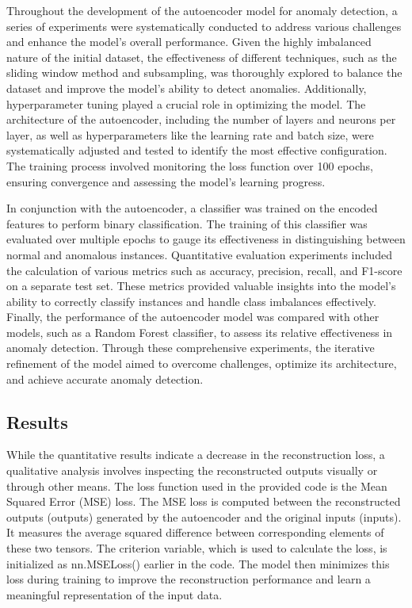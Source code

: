 \documentclass[10pt,twocolumn,letterpaper]{article}
\begin{document}
Throughout the development of the autoencoder model for anomaly detection, a series of experiments were systematically conducted to address various challenges and 
enhance the model's overall performance. Given the highly imbalanced nature of the initial dataset, the effectiveness of different techniques, such as the sliding window 
method and subsampling, was thoroughly explored to balance the dataset and improve the model's ability to detect anomalies. Additionally, hyperparameter tuning played a 
crucial role in optimizing the model. The architecture of the autoencoder, including the number of layers and neurons per layer, as well as hyperparameters like the learning 
rate and batch size, were systematically adjusted and tested to identify the most effective configuration. The training process involved monitoring the loss function over 100 
epochs, ensuring convergence and assessing the model's learning progress.

In conjunction with the autoencoder, a classifier was trained on the encoded features to perform binary classification. The training of this classifier was evaluated over 
multiple epochs to gauge its effectiveness in distinguishing between normal and anomalous instances. Quantitative evaluation experiments included the calculation of various 
metrics such as accuracy, precision, recall, and F1-score on a separate test set. These metrics provided valuable insights into the model's ability to correctly classify 
instances and handle class imbalances effectively. Finally, the performance of the autoencoder model was compared with other models, such as a Random Forest classifier, to 
assess its relative effectiveness in anomaly detection. Through these comprehensive experiments, the iterative refinement of the model aimed to overcome challenges, optimize 
its architecture, and achieve accurate anomaly detection.

\subsection{Results}
While the quantitative results indicate a decrease in the reconstruction loss, a qualitative analysis involves inspecting the reconstructed outputs visually or through 
other means. The loss function used in the provided code is the Mean Squared Error (MSE) loss. The MSE loss is computed between the reconstructed outputs (outputs) 
generated by the autoencoder and the original inputs (inputs). It measures the average squared difference between corresponding elements of these two tensors. 
The criterion variable, which is used to calculate the loss, is initialized as nn.MSELoss() earlier in the code. The model then minimizes this loss during training to 
improve the reconstruction performance and learn a meaningful representation of the input data.
\end{document}
